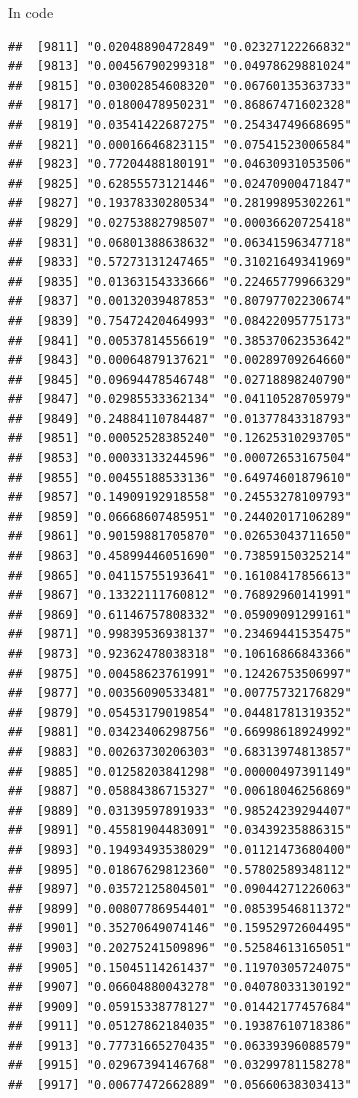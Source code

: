 \documentclass[ignorenonframetext,]{beamer}
\begin{document}
\begin{frame}[fragile]{In code}
\begin{verbatim}
##  [9811] "0.02048890472849" "0.02327122266832"
##  [9813] "0.00456790299318" "0.04978629881024"
##  [9815] "0.03002854608320" "0.06760135363733"
##  [9817] "0.01800478950231" "0.86867471602328"
##  [9819] "0.03541422687275" "0.25434749668695"
##  [9821] "0.00016646823115" "0.07541523006584"
##  [9823] "0.77204488180191" "0.04630931053506"
##  [9825] "0.62855573121446" "0.02470900471847"
##  [9827] "0.19378330280534" "0.28199895302261"
##  [9829] "0.02753882798507" "0.00036620725418"
##  [9831] "0.06801388638632" "0.06341596347718"
##  [9833] "0.57273131247465" "0.31021649341969"
##  [9835] "0.01363154333666" "0.22465779966329"
##  [9837] "0.00132039487853" "0.80797702230674"
##  [9839] "0.75472420464993" "0.08422095775173"
##  [9841] "0.00537814556619" "0.38537062353642"
##  [9843] "0.00064879137621" "0.00289709264660"
##  [9845] "0.09694478546748" "0.02718898240790"
##  [9847] "0.02985533362134" "0.04110528705979"
##  [9849] "0.24884110784487" "0.01377843318793"
##  [9851] "0.00052528385240" "0.12625310293705"
##  [9853] "0.00033133244596" "0.00072653167504"
##  [9855] "0.00455188533136" "0.64974601879610"
##  [9857] "0.14909192918558" "0.24553278109793"
##  [9859] "0.06668607485951" "0.24402017106289"
##  [9861] "0.90159881705870" "0.02653043711650"
##  [9863] "0.45899446051690" "0.73859150325214"
##  [9865] "0.04115755193641" "0.16108417856613"
##  [9867] "0.13322111760812" "0.76892960141991"
##  [9869] "0.61146757808332" "0.05909091299161"
##  [9871] "0.99839536938137" "0.23469441535475"
##  [9873] "0.92362478038318" "0.10616866843366"
##  [9875] "0.00458623761991" "0.12426753506997"
##  [9877] "0.00356090533481" "0.00775732176829"
##  [9879] "0.05453179019854" "0.04481781319352"
##  [9881] "0.03423406298756" "0.66998618924992"
##  [9883] "0.00263730206303" "0.68313974813857"
##  [9885] "0.01258203841298" "0.00000497391149"
##  [9887] "0.05884386715327" "0.00618046256869"
##  [9889] "0.03139597891933" "0.98524239294407"
##  [9891] "0.45581904483091" "0.03439235886315"
##  [9893] "0.19493493538029" "0.01121473680400"
##  [9895] "0.01867629812360" "0.57802589348112"
##  [9897] "0.03572125804501" "0.09044271226063"
##  [9899] "0.00807786954401" "0.08539546811372"
##  [9901] "0.35270649074146" "0.15952972604495"
##  [9903] "0.20275241509896" "0.52584613165051"
##  [9905] "0.15045114261437" "0.11970305724075"
##  [9907] "0.06604880043278" "0.04078033130192"
##  [9909] "0.05915338778127" "0.01442177457684"
##  [9911] "0.05127862184035" "0.19387610718386"
##  [9913] "0.77731665270435" "0.06339396088579"
##  [9915] "0.02967394146768" "0.03299781158278"
##  [9917] "0.00677472662889" "0.05660638303413"

\end{verbatim}
\end{frame}
\end{document}
